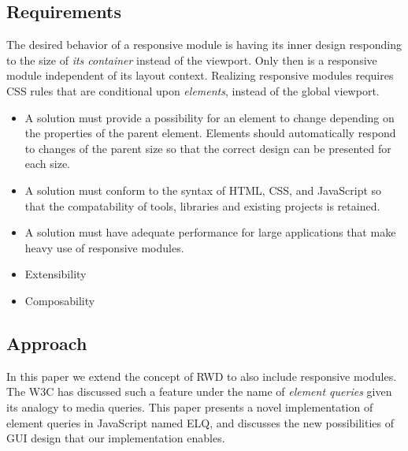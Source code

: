 \documentclass{acm_proc_article-sp}
\newcommand{\elq}{ELQ}
\begin{document}
    \label{sec:reqs}
    \subsection{Requirements}

      The desired behavior of a responsive module is having its inner design responding to the size of \emph{its container} instead of the viewport.
      Only then is a responsive module independent of its layout context.
      Realizing responsive modules requires CSS rules that are conditional upon \emph{elements}, instead of the global viewport.

      \begin{itemize}
        \item 
          A solution must provide a possibility for an element to change depending on the properties of the parent element.
          Elements should automatically respond to changes of the parent size so that the correct design can be presented for each size.
        \item
          A solution must conform to the syntax of HTML, CSS, and JavaScript so that the compatability of tools, libraries and existing projects is retained.
        \item
          A solution must have adequate performance for large applications that make heavy use of responsive modules.
        \item Extensibility
        \item Composability
      \end{itemize}

    \subsection{Approach}
      In this paper we extend the concept of RWD to also include responsive modules.
      The W3C has discussed such a feature under the name of \emph{element queries} given its analogy to media queries.
      This paper presents a novel implementation of element queries in JavaScript named \elq{}, and discusses the new possibilities of GUI design that our implementation enables.
\end{document}
